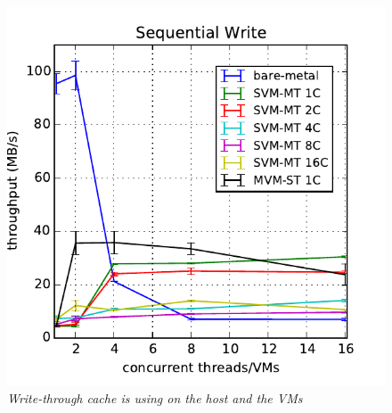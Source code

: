 \documentclass{acmsig}
\begin{document}
\begin{figure}[htbp]
  \centering
  \includegraphics[scale=0.7]{figures/throughputwritethrough.pdf}
  \caption{\textit{Write-through cache is using on the host and the VMs}}
  \label{fig:throughputwritethrough}
\end{figure}
\end{document}

